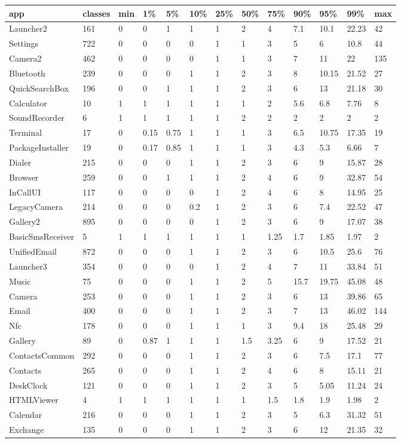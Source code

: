 \begin{tabular}{|l|l|l|l|l|l|l|l|l|l|l|l|l|}
\hline
app&classes&min&1\%&5\%&10\%&25\%&50\%&75\%&90\%&95\%&99\%&max\\
\hline
Launcher2&161&0&0&1&1&1&2&4&7.1&10.1&22.23&42\\
\hline
Settings&722&0&0&0&0&1&1&3&5&6&10.8&44\\
\hline
Camera2&462&0&0&0&0&1&1&3&7&11&22&135\\
\hline
Bluetooth&239&0&0&0&1&1&2&3&8&10.15&21.52&27\\
\hline
QuickSearchBox&196&0&0&1&1&1&2&3&6&13&21.18&30\\
\hline
Calculator&10&1&1&1&1&1&1&2&5.6&6.8&7.76&8\\
\hline
SoundRecorder&6&1&1&1&1&1&2&2&2&2&2&2\\
\hline
Terminal&17&0&0.15&0.75&1&1&1&3&6.5&10.75&17.35&19\\
\hline
PackageInstaller&19&0&0.17&0.85&1&1&1&3&4.3&5.3&6.66&7\\
\hline
Dialer&215&0&0&0&1&1&2&3&6&9&15.87&28\\
\hline
Browser&259&0&0&1&1&1&2&4&6&9&32.87&54\\
\hline
InCallUI&117&0&0&0&0&1&2&4&6&8&14.95&25\\
\hline
LegacyCamera&214&0&0&0&0.2&1&2&3&6&7.4&22.52&47\\
\hline
Gallery2&895&0&0&0&0&1&2&3&6&9&17.07&38\\
\hline
BasicSmsReceiver&5&1&1&1&1&1&1&1.25&1.7&1.85&1.97&2\\
\hline
UnifiedEmail&872&0&0&0&1&1&2&3&6&10.5&25.6&76\\
\hline
Launcher3&354&0&0&0&0&1&2&4&7&11&33.84&51\\
\hline
Music&75&0&0&0&1&1&2&5&15.7&19.75&45.08&48\\
\hline
Camera&253&0&0&0&1&1&2&3&6&13&39.86&65\\
\hline
Email&400&0&0&0&1&1&2&3&7&13&46.02&144\\
\hline
Nfc&178&0&0&0&1&1&1&3&9.4&18&25.48&29\\
\hline
Gallery&89&0&0.87&1&1&1&1.5&3.25&6&9&17.52&21\\
\hline
ContactsCommon&292&0&0&0&1&1&2&3&6&7.5&17.1&77\\
\hline
Contacts&265&0&0&0&1&1&2&4&6&8&15.11&21\\
\hline
DeskClock&121&0&0&0&1&1&2&3&5&5.05&11.24&24\\
\hline
HTMLViewer&4&1&1&1&1&1&1&1.5&1.8&1.9&1.98&2\\
\hline
Calendar&216&0&0&0&1&1&2&3&5&6.3&31.32&51\\
\hline
Exchange&135&0&0&0&1&1&2&3&6&12&21.35&32\\
\hline
\end{tabular}
